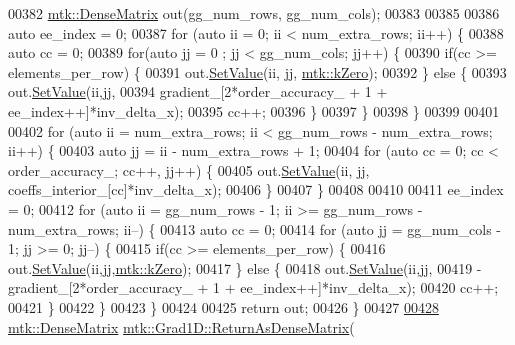 \begin{DoxyCode}
{{00382   \hyperlink{classmtk_1_1DenseMatrix}{mtk::DenseMatrix} out(gg\_num\_rows, gg\_num\_cols);
00383 
00385 
00386   \textcolor{keyword}{auto} ee\_index = 0;
00387   \textcolor{keywordflow}{for} (\textcolor{keyword}{auto} ii = 0; ii < num\_extra\_rows; ii++) \{
00388     \textcolor{keyword}{auto} cc = 0;
00389     \textcolor{keywordflow}{for}(\textcolor{keyword}{auto} jj = 0 ; jj < gg\_num\_cols; jj++) \{
00390       \textcolor{keywordflow}{if}(cc >= elements\_per\_row) \{
00391         out.\hyperlink{classmtk_1_1DenseMatrix_a784ce5784109ac86bfb9d8562b334b13}{SetValue}(ii, jj, \hyperlink{group__c01-roots_ga59a451a5fae30d59649bcda274fea271}{mtk::kZero});
00392       \} \textcolor{keywordflow}{else} \{
00393         out.\hyperlink{classmtk_1_1DenseMatrix_a784ce5784109ac86bfb9d8562b334b13}{SetValue}(ii,jj,
00394                      gradient\_[2*order\_accuracy\_ + 1 + ee\_index++]*inv\_delta\_x);
00395         cc++;
00396       \}
00397     \}
00398   \}
00399 
00401 
00402   \textcolor{keywordflow}{for} (\textcolor{keyword}{auto} ii = num\_extra\_rows; ii < gg\_num\_rows - num\_extra\_rows; ii++) \{
00403     \textcolor{keyword}{auto} jj = ii - num\_extra\_rows + 1;
00404     \textcolor{keywordflow}{for} (\textcolor{keyword}{auto} cc = 0; cc < order\_accuracy\_; cc++, jj++) \{
00405       out.\hyperlink{classmtk_1_1DenseMatrix_a784ce5784109ac86bfb9d8562b334b13}{SetValue}(ii, jj, coeffs\_interior\_[cc]*inv\_delta\_x);
00406     \}
00407   \}
00408 
00410 
00411   ee\_index = 0;
00412   \textcolor{keywordflow}{for} (\textcolor{keyword}{auto} ii = gg\_num\_rows - 1; ii >= gg\_num\_rows - num\_extra\_rows; ii--) \{
00413     \textcolor{keyword}{auto} cc = 0;
00414     \textcolor{keywordflow}{for} (\textcolor{keyword}{auto} jj = gg\_num\_cols - 1; jj >= 0; jj--) \{
00415       \textcolor{keywordflow}{if}(cc >= elements\_per\_row) \{
00416         out.\hyperlink{classmtk_1_1DenseMatrix_a784ce5784109ac86bfb9d8562b334b13}{SetValue}(ii,jj,\hyperlink{group__c01-roots_ga59a451a5fae30d59649bcda274fea271}{mtk::kZero});
00417       \} \textcolor{keywordflow}{else} \{
00418         out.\hyperlink{classmtk_1_1DenseMatrix_a784ce5784109ac86bfb9d8562b334b13}{SetValue}(ii,jj,
00419                      -gradient\_[2*order\_accuracy\_ + 1 + ee\_index++]*inv\_delta\_x);
00420         cc++;
00421       \}
00422      \}
00423   \}
00424 
00425   \textcolor{keywordflow}{return} out;
00426 \}
00427 
\hypertarget{mtk__grad__1d_8cc_source_l00428}{}\hyperlink{classmtk_1_1Grad1D_a871a3b31e257b04d5e303b3211df3a73}{00428} \hyperlink{classmtk_1_1DenseMatrix}{mtk::DenseMatrix} \hyperlink{classmtk_1_1Grad1D_a77b2eddbe4ab03f469306c604d505b1a}{mtk::Grad1D::ReturnAsDenseMatrix}(
}}
\end{DoxyCode}
